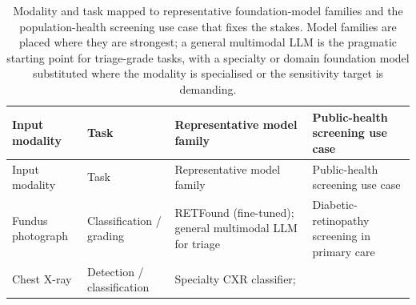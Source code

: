 \documentclass[
  letterpaper,
  11pt]{scrbook}
\begin{document}
\begin{longtable}[]{@{}
  >{\raggedright\arraybackslash}p{}
  >{\raggedright\arraybackslash}p{}
  >{\raggedright\arraybackslash}p{}
  >{\raggedright\arraybackslash}p{}@{}}
\caption{Modality and task mapped to representative foundation-model
families and the population-health screening use case that fixes the
stakes. Model families are placed where they are strongest; a general
multimodal LLM is the pragmatic starting point for triage-grade tasks,
with a specialty or domain foundation model substituted where the
modality is specialised or the sensitivity target is
demanding.}\label{tbl-modality-task-models}\tabularnewline
\toprule\noalign{}
\begin{minipage}[b]{\linewidth}\raggedright
Input modality
\end{minipage} & \begin{minipage}[b]{\linewidth}\raggedright
Task
\end{minipage} & \begin{minipage}[b]{\linewidth}\raggedright
Representative model family
\end{minipage} & \begin{minipage}[b]{\linewidth}\raggedright
Public-health screening use case
\end{minipage} \\
\midrule\noalign{}
\endfirsthead
\toprule\noalign{}
\begin{minipage}[b]{\linewidth}\raggedright
Input modality
\end{minipage} & \begin{minipage}[b]{\linewidth}\raggedright
Task
\end{minipage} & \begin{minipage}[b]{\linewidth}\raggedright
Representative model family
\end{minipage} & \begin{minipage}[b]{\linewidth}\raggedright
Public-health screening use case
\end{minipage} \\
\midrule\noalign{}
\endhead
\bottomrule\noalign{}
\endlastfoot
Fundus photograph & Classification / grading & RETFound (fine-tuned);
general multimodal LLM for triage & Diabetic-retinopathy screening in
primary care \\
Chest X-ray & Detection / classification & Specialty CXR classifier;

\end{longtable}
\end{document}
